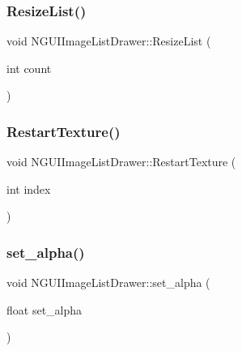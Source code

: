 \hypertarget{class_n_g_u_i_image_list_drawer_a91bbfd8b82d30f5f9a62a8cb79c6522b}{}\label{class_n_g_u_i_image_list_drawer_a91bbfd8b82d30f5f9a62a8cb79c6522b} 
\subsubsection{\texorpdfstring{Resize\+List()}{ResizeList()}}
{\footnotesize\ttfamily void N\+G\+U\+I\+Image\+List\+Drawer\+::\+Resize\+List (\begin{DoxyParamCaption}\item[{int}]{count }\end{DoxyParamCaption})}

\hypertarget{class_n_g_u_i_image_list_drawer_aa41913db8ed9727833f70310547121d6}{}\label{class_n_g_u_i_image_list_drawer_aa41913db8ed9727833f70310547121d6} 
\subsubsection{\texorpdfstring{Restart\+Texture()}{RestartTexture()}}
{\footnotesize\ttfamily void N\+G\+U\+I\+Image\+List\+Drawer\+::\+Restart\+Texture (\begin{DoxyParamCaption}\item[{int}]{index }\end{DoxyParamCaption})}

\hypertarget{class_n_g_u_i_image_list_drawer_aac25e1008c3dd2cd343b63de07578d4e}{}\label{class_n_g_u_i_image_list_drawer_aac25e1008c3dd2cd343b63de07578d4e} 
\subsubsection{\texorpdfstring{set\+\_\+alpha()}{set\_alpha()}}
{\footnotesize\ttfamily void N\+G\+U\+I\+Image\+List\+Drawer\+::set\+\_\+alpha (\begin{DoxyParamCaption}\item[{float}]{set\+\_\+alpha }\end{DoxyParamCaption})}

